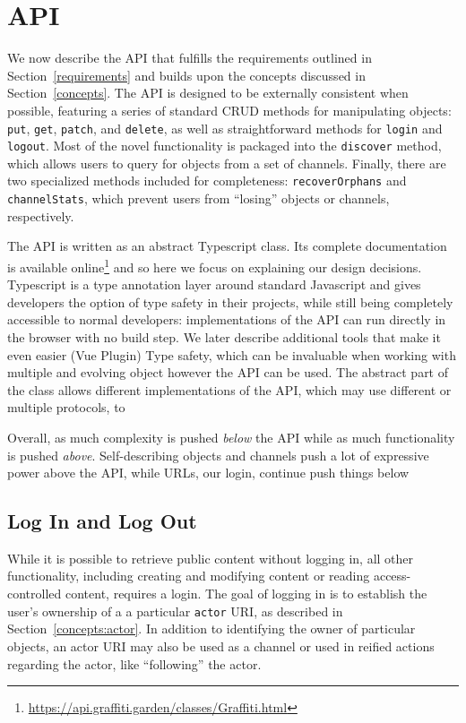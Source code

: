 \section{API}

We now describe the API that fulfills the requirements
outlined in Section~\ref{requirements} and builds upon the concepts
discussed in Section~\ref{concepts}.
The API is designed to be externally consistent when possible,
featuring a series of standard CRUD methods for manipulating objects:
\texttt{put}, \texttt{get}, \texttt{patch}, and \texttt{delete},
as well as straightforward methods for \texttt{login} and \texttt{logout}.
Most of the novel functionality is packaged into the \texttt{discover} method, which allows
users to query for objects from a set of channels.
Finally, there are two specialized methods included for completeness:
\texttt{recoverOrphans} and \texttt{channelStats},
which prevent users from ``losing'' objects or channels, respectively.

The API is written as an abstract Typescript class.
Its complete documentation is available online\footnote{
    \url{https://api.graffiti.garden/classes/Graffiti.html}
} and so here we focus on explaining our design decisions.
Typescript is a type annotation layer around standard Javascript
and gives developers the option of type safety in their projects,
while still being completely accessible to normal developers:
implementations of the API can run directly in the browser with
no build step.
We later describe additional tools that make it even easier (Vue Plugin)
Type safety, which can be invaluable when working with multiple and
evolving object
however the API can be used.
The abstract part of the class allows different implementations of
the API, which may use different or multiple protocols,
to

Overall, as much complexity is pushed \emph{below} the API
while as much functionality is pushed \emph{above}.
Self-describing objects and channels push a lot of expressive
power above the API, while URLs, our login, continue push
things below

\subsection{Log In and Log Out}

While it is possible to retrieve public content without logging in,
all other functionality, including
creating and modifying content or reading access-controlled content,
requires a login.
The goal of logging in is to establish the user's ownership of a
a particular \texttt{actor} URI, as described in Section~\ref{concepts:actor}.
In addition to identifying the owner of particular objects,
an actor URI may also be used as a channel
or used in reified actions regarding the actor, like ``following'' the actor.


